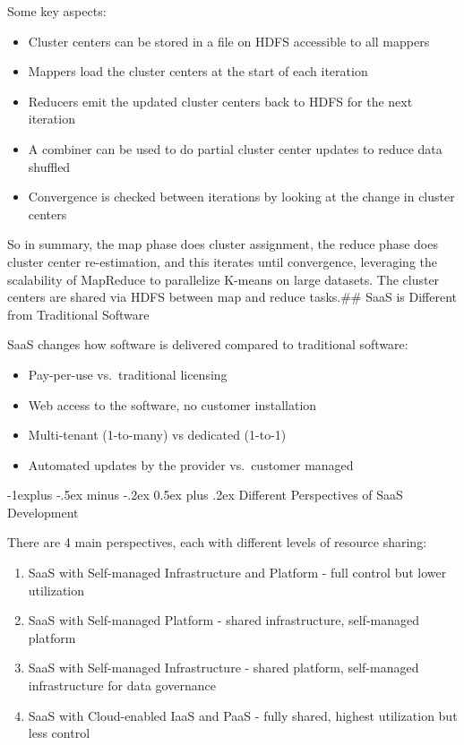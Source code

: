 \documentclass[10pt, landscape]{article}
\makeatletter
\renewcommand{\subsection}{\@startsection{subsection}{2}{0mm}%
  {-1explus -.5ex minus -.2ex}%
  {0.5ex plus .2ex}%
{\normalfont\normalsize\bfseries}}
\makeatother
\begin{document}
\begin{multicols*}{4}
Some key aspects:

\begin{itemize}
\tightlist
\item
  Cluster centers can be stored in a file on HDFS accessible to all
  mappers
\item
  Mappers load the cluster centers at the start of each iteration
\item
  Reducers emit the updated cluster centers back to HDFS for the next
  iteration
\item
  A combiner can be used to do partial cluster center updates to reduce
  data shuffled
\item
  Convergence is checked between iterations by looking at the change in
  cluster centers
\end{itemize}

So in summary, the map phase does cluster assignment, the reduce phase
does cluster center re-estimation, and this iterates until convergence,
leveraging the scalability of MapReduce to parallelize K-means on large
datasets. The cluster centers are shared via HDFS between map and reduce
tasks.\#\# SaaS is Different from Traditional Software

SaaS changes how software is delivered compared to traditional software:

\begin{itemize}
\tightlist
\item
  Pay-per-use vs.~traditional licensing
\item
  Web access to the software, no customer installation
\item
  Multi-tenant (1-to-many) vs dedicated (1-to-1)
\item
  Automated updates by the provider vs.~customer managed
\end{itemize}

\subsection{Different Perspectives of SaaS
Development}\label{different-perspectives-of-saas-development}

There are 4 main perspectives, each with different levels of resource
sharing:

\begin{enumerate}
\def\labelenumi{\arabic{enumi}.}
\tightlist
\item
  SaaS with Self-managed Infrastructure and Platform - full control but
  lower utilization
\item
  SaaS with Self-managed Platform - shared infrastructure, self-managed
  platform
\item
  SaaS with Self-managed Infrastructure - shared platform, self-managed
  infrastructure for data governance
\item
  SaaS with Cloud-enabled IaaS and PaaS - fully shared, highest
  utilization but less control
\end{enumerate}


\end{multicols*}
\end{document}
